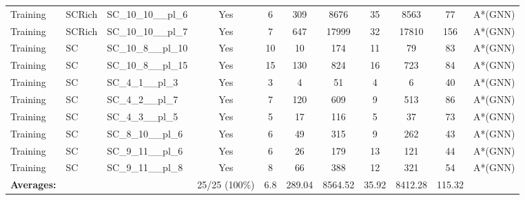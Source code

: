 \documentclass{article}
\begin{document}
\begin{tabular}{lllcccccccc}
Training & SCRich & SC\_10\_10\_\_pl\_6 & Yes & 6 & 309 & 8676 & 35 & 8563 & 77 & A*(GNN) \\
Training & SCRich & SC\_10\_10\_\_pl\_7 & Yes & 7 & 647 & 17999 & 32 & 17810 & 156 & A*(GNN) \\
Training & SC & SC\_10\_8\_\_pl\_10 & Yes & 10 & 10 & 174 & 11 & 79 & 83 & A*(GNN) \\
Training & SC & SC\_10\_8\_\_pl\_15 & Yes & 15 & 130 & 824 & 16 & 723 & 84 & A*(GNN) \\
Training & SC & SC\_4\_1\_\_pl\_3 & Yes & 3 & 4 & 51 & 4 & 6 & 40 & A*(GNN) \\
Training & SC & SC\_4\_2\_\_pl\_7 & Yes & 7 & 120 & 609 & 9 & 513 & 86 & A*(GNN) \\
Training & SC & SC\_4\_3\_\_pl\_5 & Yes & 5 & 17 & 116 & 5 & 37 & 73 & A*(GNN) \\
Training & SC & SC\_8\_10\_\_pl\_6 & Yes & 6 & 49 & 315 & 9 & 262 & 43 & A*(GNN) \\
Training & SC & SC\_9\_11\_\_pl\_6 & Yes & 6 & 26 & 179 & 13 & 121 & 44 & A*(GNN) \\
Training & SC & SC\_9\_11\_\_pl\_8 & Yes & 8 & 66 & 388 & 12 & 321 & 54 & A*(GNN) \\
\textbf{Averages:} & & & 25/25 (100\%) & 6.8 & 289.04 & 8564.52 & 35.92 & 8412.28 & 115.32 & \\
\bottomrule
\end{tabular}
\newpage
\end{document}
